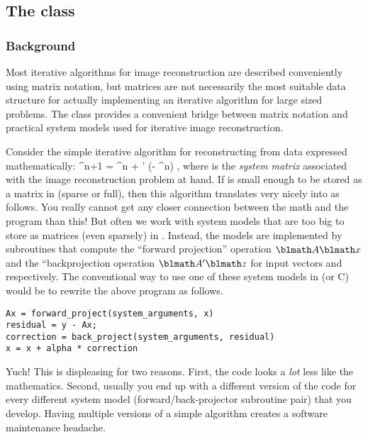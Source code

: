 

\subsection{The \fatrixx class}

\subsubsection{Background}

Most iterative algorithms
for image reconstruction
are described conveniently using matrix notation,
but matrices are not necessarily
the most suitable data structure
for actually implementing an iterative algorithm
for large sized problems.
The \fatrixx class
provides a convenient bridge
between matrix notation
and practical system models
used for iterative image reconstruction.

Consider the simple iterative algorithm
for reconstructing \x from data \y
expressed mathematically:
\be
\x^{n+1} = \x^n + \alpha \A' (\y - \A\x^n)
,
where \A is the \emph{system matrix}
associated with
the image reconstruction problem at hand.
%
If \A is small enough
to be stored as a matrix in \matlab
(sparse or full),
then this algorithm translates
very nicely into \matlab as follows.
\be
{}
You really cannot get any closer connection
between the math and the program than this!
But often we work
with system models
that are too big to store
as matrices (even sparsely) in \matlab.
Instead,
the models
are implemented by subroutines
that compute the ``forward projection'' operation
$\A \x$
and the ``backprojection operation
$\A' \z$
for input vectors \x and \z respectively.
%
The conventional way
to use one of these system models
in \matlab (or C) would be to rewrite
the above program as follows.
\begin{verbatim}
Ax = forward_project(system_arguments, x)
residual = y - Ax;
correction = back_project(system_arguments, residual)
x = x + alpha * correction
\end{verbatim}
Yuch!
This is displeasing for two reasons.
First,
the code looks a \emph{lot} less like the mathematics.
Second,
usually you end up with a different version of the code
for every different system model
(forward/back-projector subroutine pair)
that you develop.
Having multiple versions
of a simple algorithm
creates a software maintenance headache.

